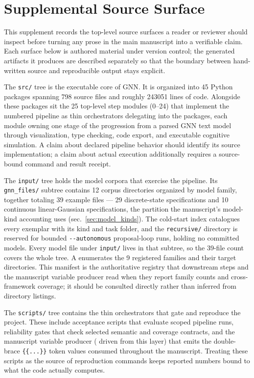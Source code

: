 \documentclass[
  english,
  9pt,
]{extarticle}
\begin{document}
\newpage

\section{Supplemental Source Surface}\label{sec:source_surface}

This supplement records the top-level source surfaces a reader or
reviewer should inspect before turning any prose in the main manuscript
into a verifiable claim. Each surface below is authored material under
version control; the generated artifacts it produces are described
separately so that the boundary between hand-written source and
reproducible output stays explicit.

The \texttt{src/} tree is the executable core of GNN. It is organized
into 45 Python packages spanning 798 source files and roughly 243051
lines of code. Alongside these packages sit the 25 top-level step
modules (0--24) that implement the numbered pipeline as thin
orchestrators delegating into the packages, each module owning one stage
of the progression from a parsed GNN text model through visualization,
type checking, code export, and executable cognitive simulation. A claim
about declared pipeline behavior should identify its source
implementation; a claim about actual execution additionally requires a
source-bound command and result receipt.

The \texttt{input/} tree holds the model corpora that exercise the
pipeline. Its \texttt{gnn\_files/} subtree contains 12 corpus
directories organized by model family, together totaling 39 example
files --- 29 discrete-state specifications and 10 continuous
linear-Gaussian specifications, the partition the manuscript's
model-kind accounting uses (sec.~\ref{sec:model_kinds}). The cold-start
index  catalogues every exemplar with
its kind and task folder, and the \texttt{recursive/} directory is
reserved for bounded \texttt{-\/-autonomous} proposal-loop runs, holding
no committed models. Every model file under \texttt{input/} lives in
that subtree, so the 39-file count covers the whole tree. A
 enumerates the 9 registered
families and their target directories. This manifest is the
authoritative registry that downstream steps and the manuscript variable
producer read when they report family counts and cross-framework
coverage; it should be consulted directly rather than inferred from
directory listings.

The \texttt{scripts/} tree contains the thin orchestrators that gate and
reproduce the project. These include acceptance scripts that evaluate
scoped pipeline runs, reliability gates that check selected semantic and
coverage contracts, and the manuscript variable producer
( driven from this layer) that
emits the double-brace \texttt{\{\{...\}\}} token values consumed
throughout the manuscript. Treating these scripts as the source of
reproduction commands keeps reported numbers bound to what the code
actually computes.
\end{document}
